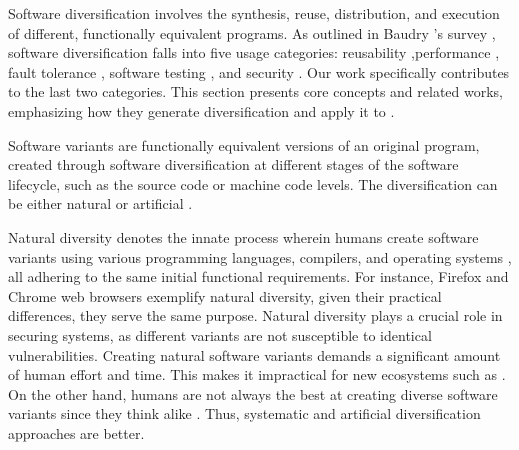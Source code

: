 

\label{sota:sw}

Software diversification involves the synthesis, reuse, distribution, and execution of different, functionally equivalent programs. 
As outlined in Baudry \etal's survey \cite{natural_diversity}, software diversification falls into five usage categories: reusability \cite{pohl2005software},performance \cite{10.1145/2025113.2025133}, fault tolerance \cite{1659219}, software testing \cite{Chen2010AdaptiveRT}, and security \cite{cohen1993operating}. 
Our work specifically contributes to the last two categories.
This section presents core concepts and related works, emphasizing how they generate diversification and apply it to \Wasm.



\label{generation}

Software variants are functionally equivalent versions of an original program, created through software diversification at different stages of the software lifecycle, such as the source code or machine code levels. 
The diversification can be either natural \cite{natural_diversity} or artificial \cite{offensive_div}.

\begin{strategy}
    \label{natural_diversity}
    Natural diversity denotes the innate process wherein humans create software variants using various programming languages, compilers, and operating systems \cite{natural_diversity}, all adhering to the same initial functional requirements.
    For instance, Firefox and Chrome web browsers exemplify natural diversity, given their practical differences, they serve the same purpose.
    Natural diversity plays a crucial role in securing systems, as different variants are not susceptible to identical vulnerabilities.
    Creating natural software variants demands a significant amount of human effort and time. 
    This makes it impractical for new ecosystems such as \Wasm.
    On the other hand, humans are not always the best at creating diverse software variants since they think alike \cite{feud}.
    Thus, systematic and artificial diversification approaches are better.
\end{strategy}


